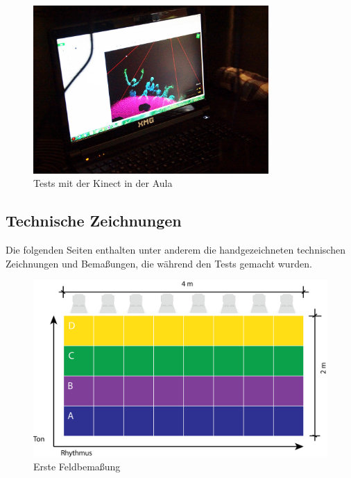 \begin{figure}[htbp]
	\centering
		\includegraphics[width=0.8\textwidth]{images/Test3.jpg}
	\caption{Tests mit der Kinect in der Aula}
	\label{fig:Test3}
\end{figure}

\clearpage

\subsection{Technische Zeichnungen}
Die folgenden Seiten enthalten unter anderem die handgezeichneten technischen Zeichnungen und Bemaßungen, die während den Tests gemacht wurden.

\vspace{1em}

\begin{figure}[htbp]
	\centering
		\includegraphics[width=1\textwidth]{images/TZ1.png}
	\caption{Erste Feldbemaßung}
	\label{fig:TZ1}
\end{figure}

